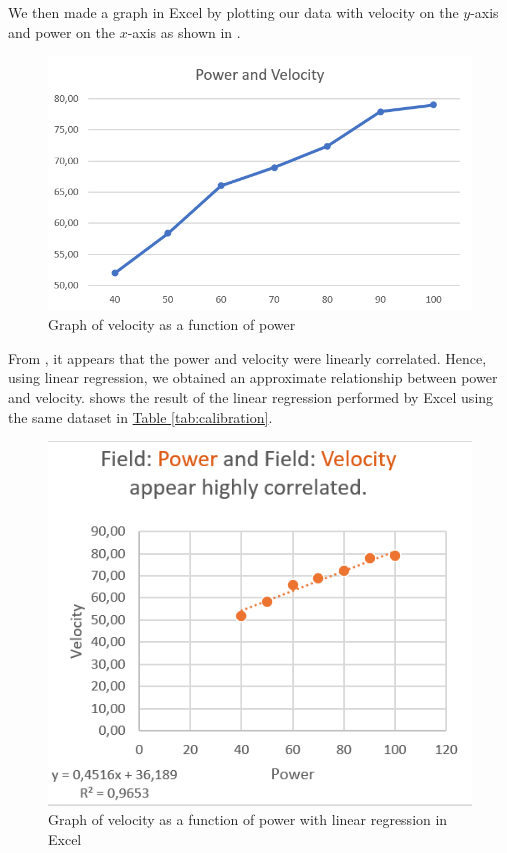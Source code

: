We then made a graph in Excel by plotting our data with velocity on the $y$-axis and power on the $x$-axis as shown in .

\begin{figure}[h!]
		\centering
	\includegraphics[width=1\linewidth]{figures/velocity_and_power}
	\caption[Graph of velocity as function of power]{Graph of velocity as a function of power}
	\label{fig:graphvelpow}
\end{figure}

From , it appears that the power and velocity were linearly correlated. Hence, using linear regression, we obtained an approximate relationship between power and velocity.  shows the result of the linear regression performed by Excel using the same dataset in \hyperref[tab:calibration]{Table \ref{tab:calibration}}.

\clearpage
\begin{figure}[h!]
	\centering
	\includegraphics[width=1\linewidth]{figures/function_of_power}
	\caption{Graph of velocity as a function of power with linear regression in Excel}
	\label{fig:functionofpower}
\end{figure}

